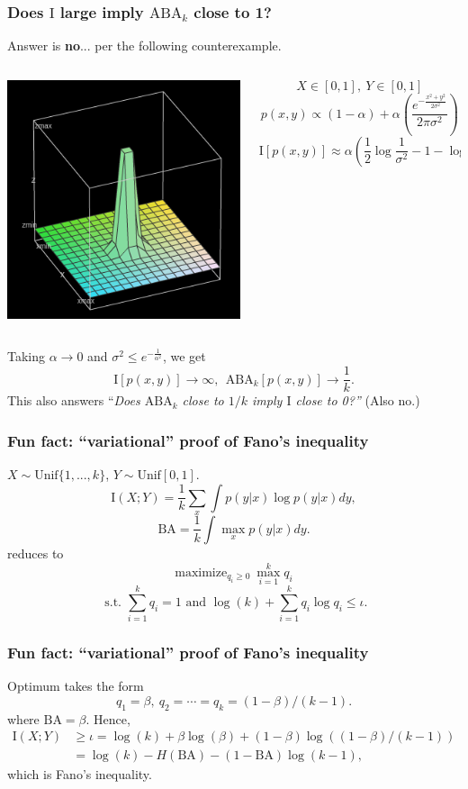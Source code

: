 \documentclass{beamer}
\begin{document}
\begin{frame}
\frametitle{Does $\text{I}$ large imply $\text{ABA}_k$ close to 1?}
Answer is \textbf{no}... per the following counterexample.
\begin{columns}
\begin{column}{0.5\textwidth}
\begin{center}
\includegraphics[scale = 0.3]{witch_hat_func.png}
\end{center}
\end{column}
\begin{column}{0.5\textwidth}
\[
X \in [0,1],\ Y \in [0,1]
\]
\[
p(x, y) \propto (1- \alpha) + \alpha \left( \frac{e^{-\frac{x^2 + y^2}{2\sigma^2}}}{2\pi\sigma^2} \right)
\]
\[
\text{I}[p(x, y)] \approx \alpha(\frac{1}{2}\log \frac{1}{\sigma^2} - 1- \log (2\pi))
\]
\end{column}
\end{columns}
Taking $\alpha \to 0$ and $\sigma^2 \leq e^{-\frac{1}{\alpha^2}}$, we get 
\[\text{I}[p(x, y)] \to \infty,\ \ \text{ABA}_k[p(x, y)] \to \frac{1}{k}.\]
This also answers ``\emph{Does $\text{ABA}_k$ close to $1/k$ imply $\text{I}$ close to 0?''} (Also no.)
\end{frame}


\begin{frame}
\frametitle{Fun fact: ``variational'' proof of Fano's inequality}
$X \sim \text{Unif}\{1,...,k\}$, $Y \sim \text{Unif}[0,1]$.
\[
\text{I}(X; Y) = \frac{1}{k}\sum_x \int p(y|x) \log p(y|x) dy,
\]
\[
\text{BA} = \frac{1}{k} \int \max_x p(y|x) dy.
\]
reduces to
\[
\text{maximize}_{q_i \geq 0}\ \max_{i=1}^k q_i\]
\[ \text{ s.t. }\sum_{i=1}^k q_i =  1\text{ and }\log(k) + \sum_{i=1}^k q_i \log q_i\leq \iota.
\]
\end{frame}

\begin{frame}
\frametitle{Fun fact: ``variational'' proof of Fano's inequality}
Optimum takes the form
\[
q_1 = \beta,\ q_2 =\cdots=q_k = (1-\beta)/(k-1).
\]
where $\text{BA} = \beta$.
Hence,
\begin{align*}
\text{I}(X; Y) &\geq \iota = \log(k) + \beta \log(\beta) + (1-\beta)\log((1-\beta)/(k-1))
\\&= \log(k)-H(\text{BA}) - (1-\text{BA})\log(k-1),
\end{align*}
which is Fano's inequality.
\end{frame}
\end{document}
